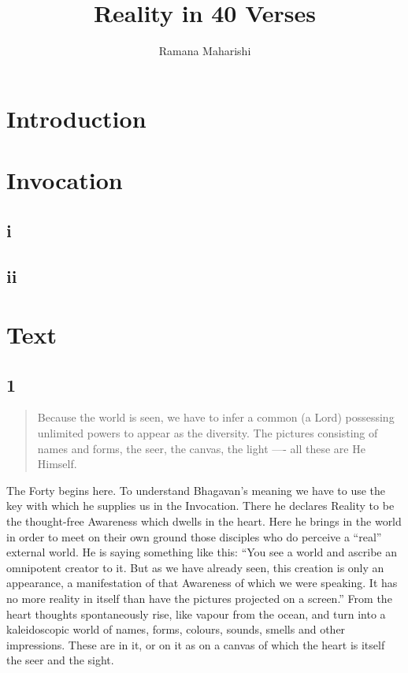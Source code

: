 \documentclass[12pt]{report}
\begin{document}
\title{Reality in 40 Verses}
\author{Ramana Maharishi}
\maketitle


\tableofcontents

\chapter{Introduction}

\chapter{Invocation}

\section*{i}
\section*{ii}

\chapter{Text}


\section*{1}

\begin{quote}
Because the world is seen, we have to infer a common (a Lord)
possessing unlimited powers to appear as the diversity. The pictures
consisting of names and forms, the seer, the canvas, the light ----
all these are He Himself.
\end{quote}


The Forty begins here. To understand Bhagavan's meaning we have to use
the key with which he supplies us in the Invocation. There he declares
Reality to be the thought-free Awareness which dwells in the
heart. Here he brings in the world in order to meet on their own
ground those disciples who do perceive a ``real'' external world. He
is saying something like this: ``You see a world and ascribe an
omnipotent creator to it. But as we have already seen, this creation
is only an appearance, a manifestation of that Awareness of which we
were speaking. It has no more reality in itself than have the pictures
projected on a screen.'' From the heart thoughts spontaneously rise,
like vapour from the ocean, and turn into a kaleidoscopic world of
names, forms, colours, sounds, smells and other impressions. These are
in it, or on it as on a canvas of which the heart is itself the seer
and the sight.
\end{document}
